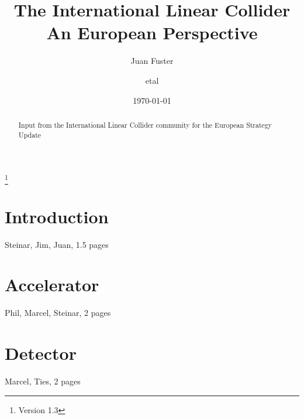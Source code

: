\documentclass[%
 reprint,
 amsmath,amssymb,
 aps,
]{revtex4-1}
\begin{document}

\title{The International Linear Collider\\ An European Perspective}%
\thanks{Version 1.3}%

\author{Juan Fuster}
\author{etal}%
%


\date{\today}%

\begin{abstract}
Input from the International Linear Collider community for the European Strategy Update

\end{abstract}

\maketitle


\section{\label{sec:intro}Introduction}

Steinar, Jim, Juan, 1.5 pages

\section{\label{sec:acc}Accelerator}

Phil, Marcel, Steinar, 2 pages

\section{\label{sec:det}Detector}
Marcel, Ties, 2 pages
\end{document}
